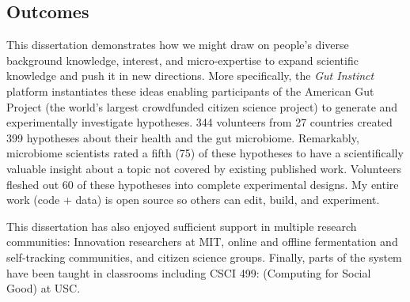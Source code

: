 
\subsection{Outcomes}


This dissertation demonstrates how we might draw on people’s diverse background knowledge, interest, and micro-expertise to expand scientific knowledge and push it in new directions. More specifically, the \textit{Gut Instinct} platform instantiates these ideas enabling participants of the American Gut Project (the world’s largest crowdfunded citizen science project) to generate and experimentally investigate hypotheses. 344 volunteers from 27 countries created 399 hypotheses about their health and the gut microbiome. Remarkably, microbiome scientists rated a fifth (75) of these hypotheses to have a scientifically valuable insight about a topic not covered by existing published work. Volunteers fleshed out 60 of these hypotheses into complete experimental designs. My entire work (code + data) is open source so others can edit, build, and experiment.

This dissertation has also enjoyed sufficient support in multiple research communities: Innovation researchers at MIT, online and offline fermentation and self-tracking communities, and citizen science groups. Finally, parts of the system have been taught in classrooms including CSCI 499: (Computing for Social Good) at USC. 

